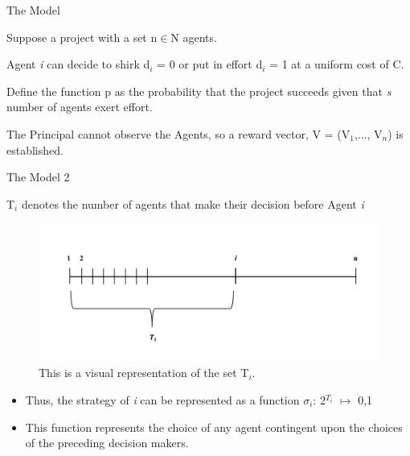 \documentclass{beamer}
\begin{document}
\begin{frame}{The Model}

\item Suppose a project with a set n$\in$N agents.
\item Agent \textit{i} can decide to shirk d$_i$ = 0 or put in effort d$_i$ = 1 at a uniform cost of C.
\item Define the function p as the probability that the project succeeds given that \textit{s} number of agents exert effort.
\item The Principal cannot observe the Agents, so a reward vector, V = (V$_1$,..., V$_n$) is established.


\end{frame}

\begin{frame}{The Model 2}

\item T$_i$ denotes the number of agents that make their decision before Agent \textit{i} 

\begin{figure}
\includegraphics[width=0.5\linewidth]{Set Ti.png}
\caption{This is a visual representation of the set T$_i$.}
\end{figure}
\begin{itemize}

\item Thus, the strategy of \textit{i} can be represented as a function $\sigma$$_i$: 2$^{T_i}$ $\mapsto$ {0,1}
\item This function represents the choice of any agent contingent upon the choices of the preceding decision makers. 

\end{itemize}
\end{frame}

\end{document}
